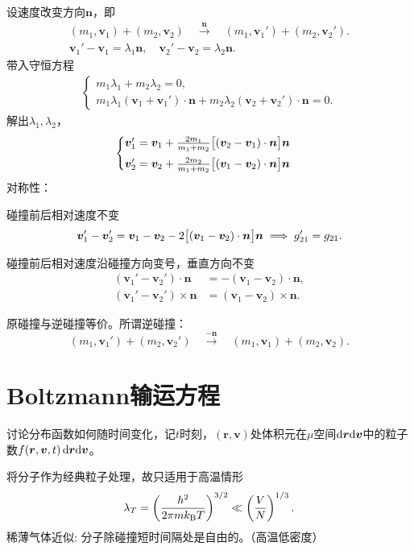 设速度改变方向$\bm n$，即
\begin{gather*}
	(m_1,\bm v_1)+(m_2,\bm v_2)\quad\overset{\bm n}{\longrightarrow}\quad(m_1,\bm v_1')+(m_2,\bm v_2').\\
	\bm v_1'-\bm v_1=\lambda_1\bm n,\quad\bm v_2'-\bm v_2=\lambda_2\bm n.
\end{gather*}
带入守恒方程
\begin{align*}
	\begin{cases}
		m_1\lambda_1+m_2\lambda_2=0,\\
		m_1\lambda_1(\bm v_1+\bm v_1')\cdot\bm n+m_2\lambda_2(\bm v_2+\bm v_2')\cdot\bm n=0.
	\end{cases}
\end{align*}
解出$\lambda_1,\lambda_2$，
\begin{align}
	\begin{cases}
		\bm v_1'=\bm v_1+\frac{2m_1}{m_1+m_2}\bigl[(\bm v_2-\bm v_1)\cdot\bm n\bigr]\bm n\\[1ex]
		\bm v_2'=\bm v_2+\frac{2m_2}{m_1+m_2}\bigl[(\bm v_1-\bm v_2)\cdot\bm n\bigr]\bm n
	\end{cases}
\end{align}
对称性：
\begin{compactenum}
	\item 碰撞前后相对速度不变
	\[
		\bm v_1'-\bm v_2'=\bm v_1-\bm v_2-2\bigl[(\bm v_1-\bm v_2)\cdot\bm n\bigr]\bm n\implies g_{21}'=g_{21}.
	\]
	\item 碰撞前后相对速度沿碰撞方向变号，垂直方向不变
	\begin{align*}
		(\bm v_1'-\bm v_2')\cdot\bm n&=-(\bm v_1-\bm v_2)\cdot\bm n,\\
		(\bm v_1'-\bm v_2')\times\bm n&=(\bm v_1-\bm v_2)\times\bm n.
	\end{align*}
	\item 原碰撞与逆碰撞等价。所谓逆碰撞：
	\[
		(m_1,\bm v_1')+(m_2,\bm v_2')\quad\overset{-\bm n}{\longrightarrow}\quad(m_1,\bm v_1)+(m_2,\bm v_2).
	\]
\end{compactenum}
\section{Boltzmann输运方程}
讨论分布函数如何随时间变化，记$t$时刻，$(\bm r,\bm v)$处体积元在$\mu$空间$\mathop{}\!\mathrm{d}\bm r\mathrm{d}\bm v$中的粒子数$f(\bm r,\bm v,t)\mathop{}\!\mathrm{d}\bm r\mathrm{d}\bm v$。

将分子作为经典粒子处理，故只适用于高温情形
\[
	\lambda_T=\left(\frac{h^2}{2\pi mk_{\mathrm B} T}\right)^{3/2}\ll\left(\frac VN\right)^{1/3}.
\]
稀薄气体近似: 分子除碰撞短时间隔处是自由的。（高温低密度）

